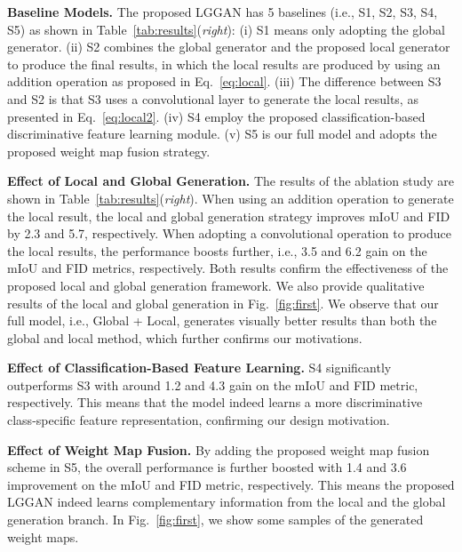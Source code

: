\documentclass[10pt,twocolumn,letterpaper]{article}
\begin{document}
\noindent \textbf{Baseline Models.}
The proposed LGGAN has 5 baselines (i.e., S1, S2, S3, S4, S5) as shown in Table~\ref{tab:results}(\textit{right}): 
(i) S1 means only adopting the global generator.
(ii) S2 combines the global generator and the proposed local generator to produce the final results, in which the local results are produced by using an addition operation as proposed in Eq.~\eqref{eq:local}.
(iii) The difference between S3 and S2 is that S3 uses 
a convolutional layer to generate the local results, as presented in Eq.~\eqref{eq:local2}.
(iv) S4 employ the proposed classification-based discriminative feature learning module.
(v) S5 is our full model and adopts the proposed weight map fusion strategy.

\noindent \textbf{Effect of Local and Global Generation.}
The results of the ablation study are shown in Table~\ref{tab:results}(\textit{right}).
When using an addition operation to generate the local result, the local and global generation strategy improves mIoU and FID by 2.3 and 5.7, respectively.
When adopting a convolutional operation to produce the local results, the performance boosts further, i.e., 3.5 and 6.2 gain on the mIoU and FID metrics, respectively.
Both results confirm the effectiveness of the proposed local and global generation framework.
We also provide qualitative results of the local and global generation in Fig.~\ref{fig:first}. 
We observe that our full model, i.e., Global + Local,  generates visually better results than both the global and local method, 
which further confirms our motivations.

\noindent \textbf{Effect of Classification-Based Feature Learning.}
S4 significantly outperforms S3 with around 1.2 and 4.3 gain on the mIoU and FID metric, respectively. This means that the model indeed learns a more discriminative class-specific feature representation, confirming our design motivation.

\noindent \textbf{Effect of Weight Map Fusion.}
By adding the proposed weight map fusion scheme in S5, the overall performance is further boosted with 1.4 and 3.6 improvement on the mIoU and FID metric, respectively.
This means the proposed LGGAN indeed learns complementary information from the local and the global generation branch.
In Fig.~\ref{fig:first}, we show some samples of the generated weight maps. 
%
\end{document}
